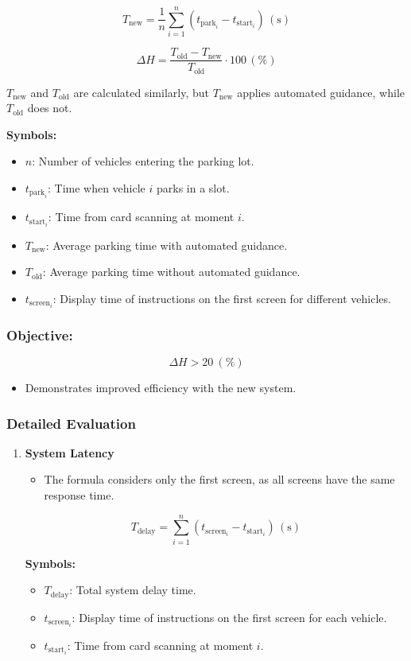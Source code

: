 \documentclass{article}
\begin{document}
\begin{itemize}[label=-]
\[
T_\text{new} = \frac{1}{n}\sum_{i=1}^{n} \left( t_{\text{park}_i} - t_{\text{start}_i} \right) \, (\text{s})
\]

\[
\Delta{H} = \frac{T_\text{old} - T_\text{new}}{T_\text{old}} \cdot 100\, (\%)
\]

$T_\text{new}$ and $T_\text{old}$ are calculated similarly, but $T_\text{new}$ applies automated guidance, while $T_\text{old}$ does not.

\textbf{Symbols:}
\begin{itemize}[label=-]
    \item $n$: Number of vehicles entering the parking lot.
    \item $t_{\text{park}_i}$: Time when vehicle $i$ parks in a slot.
    \item $t_{\text{start}_i}$: Time from card scanning at moment $i$.
    \item $T_{\text{new}}$: Average parking time with automated guidance.
    \item $T_{\text{old}}$: Average parking time without automated guidance.
    \item $t_{\text{screen}_i}$: Display time of instructions on the first screen for different vehicles.
\end{itemize}

\subsubsection{Objective:} \[\Delta{H} > 20\ (\%)\]
\begin{itemize}
    \item Demonstrates improved efficiency with the new system.
\end{itemize}

\subsubsection{Detailed Evaluation}
\begin{enumerate}
    \item \textbf{System Latency}
    \begin{itemize}
        \item The formula considers only the first screen, as all screens have the same response time.
    \end{itemize}

\[
T_\text{delay} = \sum_{i=1}^{n} \left( t_\text{screen}_i - t_\text{start}_i \right) \, (\text{s})
\]

    \textbf{Symbols:}
    \begin{itemize}[label=-]
        \item $T_\text{delay}$: Total system delay time.
        \item $t_\text{screen}_i$: Display time of instructions on the first screen for each vehicle.
        \item $t_\text{start}_i$: Time from card scanning at moment $i$.
    \end{itemize}


\end{enumerate}
\end{itemize}
\end{document}
